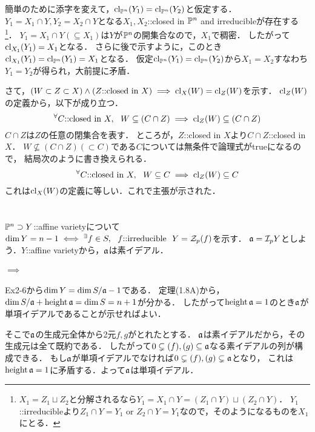 \documentclass[a4paper]{jsarticle}
\begin{document}
    簡単のために添字を変えて，$\operatorname{cl}_{\mathbb{P}^n}(Y_1)=\operatorname{cl}_{\mathbb{P}^n}(Y_2)$と仮定する．
    $Y_1=X_1 \cap Y, Y_2=X_2 \cap Y$となる$X_1, X_2$::closed in $\mathbb{P}^n$ and irreducibleが存在する
    \footnote{$X_1=Z_1 \sqcup Z_2$と分解されるなら$Y_1=X_1 \cap Y=(Z_1 \cap Y) \sqcup (Z_2 \cap Y)$．
    $Y_1$::irreducibleより$Z_1 \cap Y=Y_1$ or $Z_2 \cap Y=Y_1$なので，そのようになるものを$X_1$にとる．}．
    $Y_1=X_1 \cap Y( \subseteq X_1)$は$Y$が$\mathbb{P}^n$の開集合なので，$X_1$で稠密．
    したがって$\operatorname{cl}_{X_1}(Y_1)=X_1$となる．
    さらに後で示すように，このとき$\operatorname{cl}_{X_1}(Y_1)=\operatorname{cl}_{\mathbb{P}^n}(Y_1)=X_1$となる．
    仮定$\operatorname{cl}_{\mathbb{P}^n}(Y_1)=\operatorname{cl}_{\mathbb{P}^n}(Y_2)$から$X_1=X_2$すなわち$Y_1=Y_2$が得られ，大前提に矛盾．

    さて，$(W \subset Z \subset X) \land (Z\mbox{::closed in }X) \implies \operatorname{cl}_{X}(W)=\operatorname{cl}_{Z}(W)$を示す．
    $\operatorname{cl}_{Z}(W)$の定義から，以下が成り立つ．
    \[ {}^{\forall} C\mbox{::closed in }X,~~ W \subseteq (C \cap Z) \implies \operatorname{cl}_{Z}(W) \subseteq (C \cap Z) \]
    $C \cap Z$は$Z$の任意の閉集合を表す．
    ところが，$Z$::closed in $X$より$C \cap Z$::closed in $X$．
    $W \not \subseteq (C \cap Z)( \subset C)$である$C$については無条件で論理式がtrueになるので，
    結局次のように書き換えられる．
    \[ {}^{\forall} C\mbox{::closed in }X,~~ W \subseteq C \implies \operatorname{cl}_{Z}(W) \subseteq C \]
    これは$\operatorname{cl}_{X}(W)$の定義に等しい．これで主張が示された．

\section{ } %
$\mathbb{P}^n \supset Y$::affine varietyについて$\dim Y=n-1 \iff {}^{\exists} f \in S,~~ f \mbox{::irreducible}~~ Y=\mathcal{Z}_p(f)$を示す．
    $\mathfrak{a}=\mathcal{I}_p{Y}$としよう．$Y$::affine varietyから，$\mathfrak{a}$は素イデアル．
    \paragraph{$\implies$}
    Ex2-6から$\dim Y=\dim S/\mathfrak{a}-1$である．
    定理(1.8A)から，$\dim S/\mathfrak{a}+\operatorname{height} \mathfrak{a}=\dim S=n+1$が分かる．
    したがって$\operatorname{height} \mathfrak{a}=1$のとき$\mathfrak{a}$が単項イデアルであることが示せればよい．

    そこで$\mathfrak{a}$の生成元全体から2元$f,g$がとれたとする．
    $\mathfrak{a}$は素イデアルだから，その生成元は全て既約である．
    したがって$0 \subsetneq (f),(g) \subseteq \mathfrak{a}$なる素イデアルの列が構成できる．
    もし$\mathfrak{a}$が単項イデアルでなければ$0 \subsetneq (f),(g) \subsetneq \mathfrak{a}$となり，
    これは$\operatorname{height} \mathfrak{a}=1$に矛盾する．よって$\mathfrak{a}$は単項イデアル．
\end{document}
